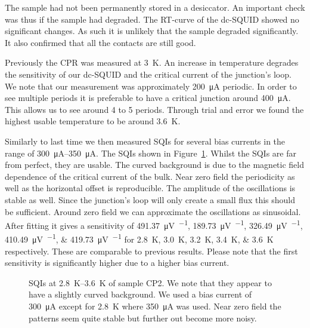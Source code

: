 The sample had not been permanently stored in a desiccator. An important check was thus if the sample had degraded. The RT-curve of the dc-SQUID showed no significant changes. As such it is unlikely that the sample degraded significantly. It also confirmed that all the contacts are still good.

Previously the CPR was measured at \qty{3}{\kelvin}. An increase in temperature degrades the sensitivity of our dc-SQUID and the critical current of the junction's loop. We note that our measurement was approximately \qty{200}{\micro\ampere} periodic. In order to see multiple periods it is preferable to have a critical junction around \qty{400}{\micro\ampere}. This allows us to see around 4 to 5 periods. Through trial and error we found the highest usable temperature to be around \qty{3.6}{\kelvin}.

Similarly to last time we then measured SQIs for several bias currents in the range of \qtyrange{300}{350}{\micro\ampere}. The SQIs shown in Figure~\ref{fig:CP2.6B_revisited_SQIs}. Whilst the SQIs are far from perfect, they are usable. The curved background is due to the magnetic field dependence of the critical current of the bulk. Near zero field the periodicity as well as the horizontal offset is reproducible. The amplitude of the oscillations is stable as well. Since the junction's loop will only create a small flux this should be sufficient. Around zero field we can approximate the oscillations as sinusoidal. After fitting it gives a sensitivity of \qtylist{491.37;189.73;326.49;410.49;419.73}{\micro\volt\per\fluxquantum} for \qtylist{2.8;3.0;3.2;3.4;3.6}{\kelvin} respectively. These are comparable to previous results. Please note that the first sensitivity is significantly higher due to a higher bias current.

\begin{figure}[ht!]
	\centering
	
	\caption{SQIs at \qtyrange{2.8}{3.6}{\kelvin} of sample CP2. We note that they appear to have a slightly curved background. We used a bias current of \qty{300}{\micro\ampere} except for \qty{2.8}{\kelvin} where \qty{350}{\micro\ampere} was used. Near zero field the patterns seem quite stable but further out become more noisy.}
	\label{fig:CP2.6B_revisited_SQIs}
\end{figure}


